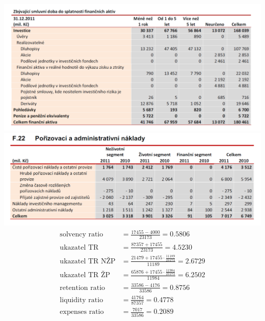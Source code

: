 \documentclass[12pt,oneside]{fithesis}
\begin{document}
\includegraphics[width=1.0\textwidth]{cp-likv.png}
\includegraphics[width=1.0\textwidth]{cp-nakl.png}
\begin{align*}
	\text{solvency ratio}&=\frac{17 455-4 000}{23 173}=0.5806\\
	\text{ukazatel TR}&=\frac{87 357+17 455}{23 173}=4.5230\\
	\text{ukazatel TR NŽP}&=\frac{21479+17 455\cdot\frac{11189}{23173}}{11189}=2.6729\\
	\text{ukazatel TR ŽP}&=\frac{65876+17 455\cdot\frac{11984}{23173}}{11984}=6.2502\\
	\text{retention ratio}&=\frac{33586-4176}{33 586}=0.8756\\
	\text{liquidity ratio}&=\frac{41 764}{87 357}=0.4778\\
	\text{expenses ratio}&=\frac{7 017}{33 586}=0.2089\\
\end{align*}
\end{document}
